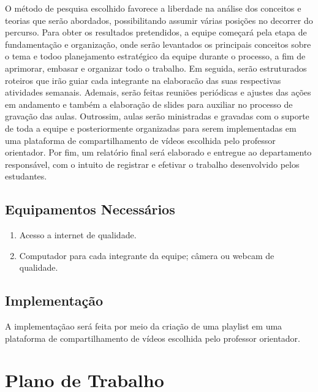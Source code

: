 \documentclass[a4paper,10pt]{article} %
\begin{document}
O método de pesquisa escolhido favorece a liberdade na análise dos conceitos e teorias que serão abordados, possibilitando assumir várias posições no decorrer do percurso. Para obter os resultados pretendidos, a equipe começará pela etapa de fundamentação e organização, onde serão levantados os principais conceitos sobre o tema e todoo planejamento estratégico da equipe durante o processo, a fim de aprimorar, embasar e organizar todo o trabalho. Em seguida, serão estruturados roteiros que irão guiar cada integrante na elaboracão das suas respectivas atividades semanais. Ademais, serão feitas reuniões periódicas e ajustes das ações em andamento e também a elaboração de slides para auxiliar no processo de gravação das aulas. Outrossim, aulas serão ministradas e gravadas com o suporte de toda a equipe e posteriormente organizadas para serem implementadas em uma plataforma de compartilhamento de vídeos escolhida  pelo  professor orientador. Por fim, um relatório final será elaborado e entregue ao departamento responsável, com o intuito de registrar e efetivar o trabalho desenvolvido pelos estudantes.
 
\subsection{Equipamentos Necessários}

\begin{enumerate}
 \item Acesso a internet de qualidade.
 \item Computador para cada integrante da equipe; câmera ou webcam de qualidade.
\end{enumerate}

\subsection{Implementação}
A implementaçãao será feita por meio da criação de uma playlist em uma plataforma de compartilhamento de vídeos escolhida pelo professor orientador.

\section{Plano de Trabalho}
\end{document}
